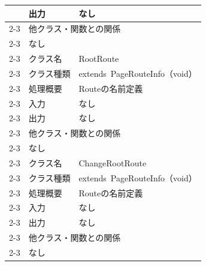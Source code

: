 \begin{longtable}{|c|l|l|}
                            & 出力                                                & なし                                            \\ \cline{2-3}
                            & \multicolumn{2}{l|}{他クラス・関数との関係}                                                                  \\ \cline{2-3}
                            & \multicolumn{2}{p{14cm}|}{なし}                                                                     \\ \cline{2-3}
                            & クラス名                                              & RootRoute                                     \\ \cline{2-3}
                            & クラス種類                                             & extends\ PageRouteInfo（void）                  \\ \cline{2-3}
                            & 処理概要                                              & \multicolumn{1}{p{12cm}|}{Routeの名前定義}         \\ \cline{2-3}
                            & 入力                                                & なし                                            \\ \cline{2-3}
                            & 出力                                                & なし                                            \\ \cline{2-3}
                            & \multicolumn{2}{l|}{他クラス・関数との関係}                                                                  \\ \cline{2-3}
                            & \multicolumn{2}{p{14cm}|}{なし}                                                                     \\ \cline{2-3}
                            & クラス名                                              & ChangeRootRoute                               \\ \cline{2-3}
                            & クラス種類                                             & extends\ PageRouteInfo（void）                  \\ \cline{2-3}
                            & 処理概要                                              & \multicolumn{1}{p{12cm}|}{Routeの名前定義}         \\ \cline{2-3}
                            & 入力                                                & なし                                            \\ \cline{2-3}
                            & 出力                                                & なし                                            \\ \cline{2-3}
                            & \multicolumn{2}{l|}{他クラス・関数との関係}                                                                  \\ \cline{2-3}
                            & \multicolumn{2}{p{14cm}|}{なし}                                                                     \\ \hline
  
\end{longtable}

